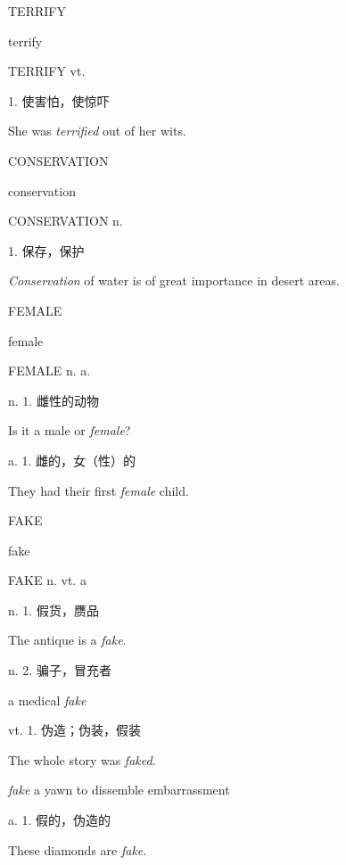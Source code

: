 \begin{flashcard}{
TERRIFY

terrify
}
\begin{center}
TERRIFY vt. 
\end{center}
1. 使害怕，使惊吓

She was \textit{terrified} out of her wits.

\end{flashcard}
\begin{flashcard}{
CONSERVATION

conservation
}
\begin{center}
CONSERVATION n. 
\end{center}
1. 保存，保护

\textit{Conservation} of water is of great importance in desert areas.

\end{flashcard}
\begin{flashcard}{
FEMALE

female
}
\begin{center}
FEMALE n. a. 
\end{center}
n. 1. 雌性的动物

Is it a male or \textit{female}?

a. 1. 雌的，女（性）的

They had their first \textit{female} child.

\end{flashcard}
\begin{flashcard}{
FAKE

fake
}
\begin{center}
FAKE n. vt. a \textipa{[feik]}
\end{center}
n. 1. 假货，赝品

The antique is a \textit{fake}.

n. 2. 骗子，冒充者

a medical \textit{fake}

vt. 1. 伪造；伪装，假装

The whole story was \textit{faked}.

\textit{fake} a yawn to dissemble embarrassment

a. 1. 假的，伪造的

These diamonds are \textit{fake}.

\end{flashcard}
